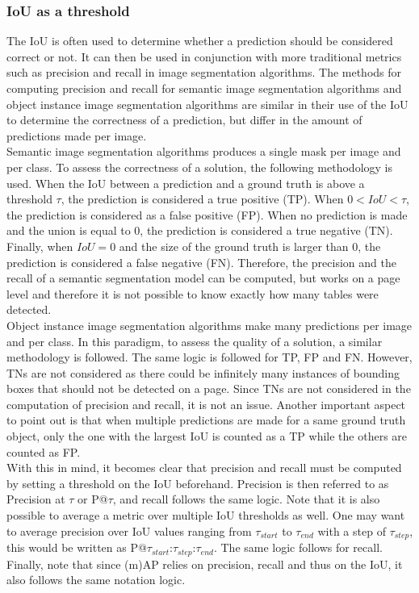 \subsubsection{IoU as a threshold}
The IoU is often used to determine whether a prediction should be considered correct or not. It can then be used in conjunction with more traditional metrics such as precision and recall in image segmentation algorithms. The methods for computing precision and recall for semantic image segmentation algorithms and object instance image segmentation algorithms are similar in their use of the IoU to determine the correctness of a prediction, but differ in the amount of predictions made per image.\\
Semantic image segmentation algorithms produces a single mask per image and per class. To assess the correctness of a solution, the following methodology is used. When the IoU between a prediction and a ground truth is above a threshold $\tau$, the prediction is considered a true positive (TP). When $0 < IoU < \tau$, the prediction is considered as a false positive (FP). When no prediction is made and the union is equal to 0, the prediction is considered a true negative (TN). Finally, when $IoU = 0$ and the size of the ground truth is larger than 0, the prediction is considered a false negative (FN). Therefore, the precision and the recall of a semantic segmentation model can be computed, but works on a page level and therefore it is not possible to know exactly how many tables were detected.\\
Object instance image segmentation algorithms make many predictions per image and per class. In this paradigm, to assess the quality of a solution, a similar methodology is followed. The same logic is followed for TP, FP and FN. However, TNs are not considered as there could be infinitely many instances of bounding boxes that should not be detected on a page. Since TNs are not considered in the computation of precision and recall, it is not an issue. Another important aspect to point out is that when multiple predictions are made for a same ground truth object, only the one with the largest IoU is counted as a TP while the others are counted as FP. \\
With this in mind, it becomes clear that precision and recall must be computed by setting a threshold on the IoU beforehand. Precision is then referred to as Precision at $\tau$ or P@$\tau$, and recall follows the same logic. Note that it is also possible to average a metric over multiple IoU thresholds as well. One may want to average precision over IoU values ranging from $\tau_{start}$ to $\tau_{end}$ with a step of $\tau_{step}$, this would be written as P@$\tau_{start}$:$\tau_{step}$:$\tau_{end}$. The same logic follows for recall. Finally, note that since (m)AP relies on precision, recall and thus on the IoU, it also follows the same notation logic.

